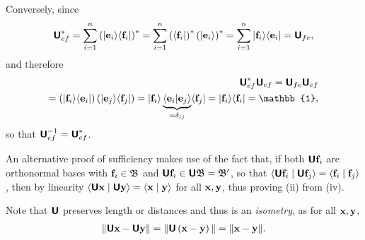 {Conversely,  since
\begin{equation}
\begin{split}
\textsf{\textbf{U}}_{ef}^\ast
= \sum_{i=1}^n \left(\vert {\bf e}_i \rangle \langle {\bf f}_i \vert \right)^\ast
= \sum_{i=1}^n \left( \langle {\bf f}_i \vert \right)^\ast \left(\vert {\bf e}_i \rangle \right)^\ast
= \sum_{i=1}^n \vert {\bf f}_i \rangle \langle {\bf e}_i \vert = \textsf{\textbf{U}}_{fe},
\end{split}
\label{2016-m-ch-uniteq7134}
\end{equation}   and   therefore
\begin{equation}
\begin{split}
\textsf{\textbf{U}}_{ef}^\ast \textsf{\textbf{U}}_{ef}= \textsf{\textbf{U}}_{fe} \textsf{\textbf{U}}_{ef}
\\
=
\left(\vert {\bf f}_i \rangle \langle {\bf e}_i \vert  \right)
\left(\vert {\bf e}_j \rangle \langle {\bf f}_j \vert \right)
=
 \vert {\bf f}_i \rangle \underbrace{\langle {\bf e}_i \vert   {\bf e}_j \rangle }_{=\delta_{ij}}
\langle {\bf f}_j \vert
=
 \vert {\bf f}_i \rangle   \langle {\bf f}_i \vert
= \mathbb{1},
\end{split}
\label{2016-m-ch-uniteq71345}
\end{equation}
so that
$\textsf{\textbf{U}}_{ef}^{-1} =\textsf{\textbf{U}}_{ef}^\ast$.

An alternative proof of sufficiency makes use of the fact that, if both $\textsf{\textbf{U}} {\bf f}_i$ are  orthonormal bases with ${\bf f}_i \in {\frak B}$
and  $\textsf{\textbf{U}}{\bf f}_i \in \textsf{\textbf{U}}{\frak B}= {\frak B}'$,
so that
$
\langle \textsf{\textbf{U}} {\bf f}_i \mid \textsf{\textbf{U}} {\bf f}_j \rangle
=
\langle {\bf f}_i \mid  {\bf f}_j \rangle$,
then by linearity
$
\langle \textsf{\textbf{U}} {\bf x} \mid \textsf{\textbf{U}} {\bf y} \rangle
=
\langle  {\bf x} \mid  {\bf y} \rangle $
for all ${\bf x},  {\bf y}$,
thus proving (ii) from (iv).





\eproof
}

Note that $\textsf{\textbf{U}}$ preserves length or distances and thus is an {\em isometry}, as for all ${\bf x}, {\bf y}$,
\begin{equation}
\begin{split}
\| \textsf{\textbf{U}}{\bf x} - \textsf{\textbf{U}}{\bf y} \| =
\| \textsf{\textbf{U}}\left( {\bf x} - {\bf y} \right) \| =
\|{\bf x}- {\bf y}\|
.
\end{split}
\label{2016-m-ch-uniteqpl}
\end{equation}

